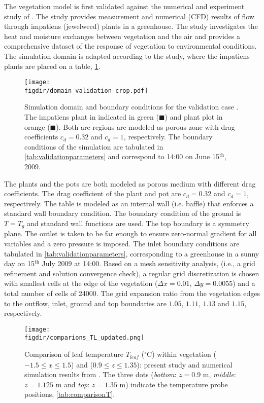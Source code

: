 The vegetation model is first validated against the numerical and experiment study of \cite{Kichah2012}. The study provides measurement and numerical (CFD) results of flow through impatiens (jewelweed) plants in a greenhouse. The study investigates the heat and moisture exchanges between vegetation and the air and provides a comprehensive dataset of the response of vegetation to environmental conditions. The simulation domain is adapted according to the study, where the impatiens plants are placed on a table, \cref{fig:domain_validation}.

	\begin{figure}[h]
		\centering
		\texttt{[image: \\figdir/domain\_validation-crop.pdf]}
		\caption{Simulation domain and boundary conditions for the validation case \cite{Kichah2012}. The impatiens plant in indicated in green ({\color{flatuidarkgreen}$\blacksquare$}) and plant plot in orange ({\color{flatuiorange}$\blacksquare$}). Both are regions are modeled as porous zone with drag coefficients $c_d=0.32$ and $c_d=1$, respectively. The boundary conditions of the simulation are tabulated in \cref{tab:validationparameters} and correspond to 14:00 on June 15$^{\mathrm{th}}$, 2009.}
		\label{fig:domain_validation}
	\end{figure}

The plants and the pots are both modeled as porous medium with different drag coefficients. The drag coefficient of the plant and pot are $c_d=0.32$ and $c_d=1$, respectively. The table is modeled as an internal wall (i.e. baffle) that enforces a standard wall boundary condition. The boundary condition of the ground is $T=T_g$ and standard wall functions are used. The top boundary is a symmetry plane. The outlet is taken to be far enough to ensure zero-normal gradient for all variables and a zero pressure is imposed. The inlet boundary conditions are tabulated in \cref{tab:validationparameters}, corresponding to a greenhouse in a sunny day on 15$^{\mathrm{th}}$ July 2009 at 14:00. Based on a mesh sensitivity analysis, (i.e., a grid refinement and solution convergence check), a regular grid discretization is chosen with smallest cells at the edge of the vegetation ($\Delta x=0.01,\,\Delta y=\num{0.0055}$) and a total number of cells of \num{24000}. The grid expansion ratio from the vegetation edges to the outflow, inlet, ground and top boundaries are $1.05$, $1.11$, $1.13$ and $1.15$, respectively. 

	\begin{figure}[h]
	\centering
	\texttt{[image: \\figdir/comparions\_TL\_updated.png]}
	\caption{Comparison of leaf temperature $T_\mathit{leaf}$ ($^{\circ}$C) within vegetation ($-1.5\le x \le 1.5$) and ($0.9 \le z \le 1.35$):  present study and  numerical simulation results from \citep{Kichah2012}. The three dots (\textit{bottom}: $z=0.9$ m, \textit{middle}: $z=1.125$ m and \textit{top}: $z=1.35$ m) indicate the temperature probe positions, \cref{tab:comparisonT}.}
	\label{fig:comparions_TL_updated}
	\end{figure}

